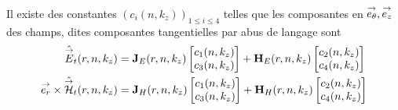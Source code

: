   \begin{prop}
    Il existe des constantes \((c_i(n,k_z))_{1\le i\le 4}\) telles que les composantes en \({\overset{\rightarrow}{e_\theta}},{\overset{\rightarrow}{e_z}}\) des champs, dites composantes tangentielles par abus de langage sont
    \begin{subequations}
      \begin{align}
        \hat {{\overset{\rightarrow}{E}}}_t(r,n,k_z) &= \mathbf{J}_{E}(r,n,k_z)
        \begin{bmatrix}
          c_1(n,k_z) \\
          c_3(n,k_z)
        \end{bmatrix}
        +
        \mathbf{H}_{E}(r,n,k_z)
        \begin{bmatrix}
          c_2(n,k_z) \\
          c_4(n,k_z)
        \end{bmatrix}
        \label{eq:imp_fourier:cylindre:Et}
        \\
        {\overset{\rightarrow}{e_r}}\times\hat {{\overset{\rightarrow}{\mathcal{H}}}}_t(r,n,k_z) &=
        \mathbf{J}_{H}(r,n,k_z)
        \begin{bmatrix}
          c_1(n,k_z) \\
          c_3(n,k_z)
        \end{bmatrix}
        +
        \mathbf{H}_{H}(r,n,k_z)
        \begin{bmatrix}
          c_2(n,k_z) \\
          c_4(n,k_z)
        \end{bmatrix}
        \label{eq:imp_fourier:cylindre:Ht}
      \end{align}
    \end{subequations}
  \end{prop}


